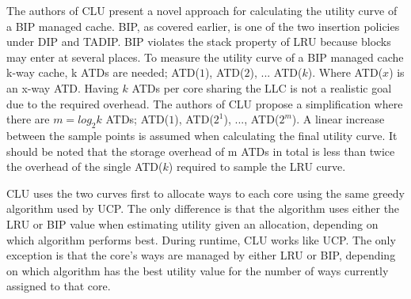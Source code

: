 The authors of CLU present a novel approach for calculating the utility curve of a BIP managed cache.
BIP, as covered earlier, is one of the two insertion policies under DIP and TADIP. 
BIP violates the stack property of LRU because blocks may enter at several places.
To measure the utility curve of a BIP managed cache k-way cache, k ATDs are needed; ATD($1$), ATD($2$), ... ATD($k$). 
Where ATD($x$) is an x-way ATD.
Having $k$ ATDs per core sharing the LLC is not a realistic goal due to the required overhead.
The authors of CLU propose a simplification where there are $m = log_2 k$ ATDs; ATD($1$), ATD($2^1$), ..., ATD($2^m$).
A linear increase between the sample points is assumed when calculating the final utility curve.
It should be noted that the storage overhead of m ATDs in total is less than twice the overhead of the single ATD($k$) required to sample the LRU curve.

CLU uses the two curves first to allocate ways to each core using the same greedy algorithm used by UCP.
The only difference is that the algorithm uses either the LRU or BIP value when estimating utility given an allocation, depending on which algorithm performs best.
During runtime, CLU works like UCP.
The only exception is that the core's ways are managed by either LRU or BIP, depending on which algorithm has the best utility value for the number of ways currently assigned to that core.
